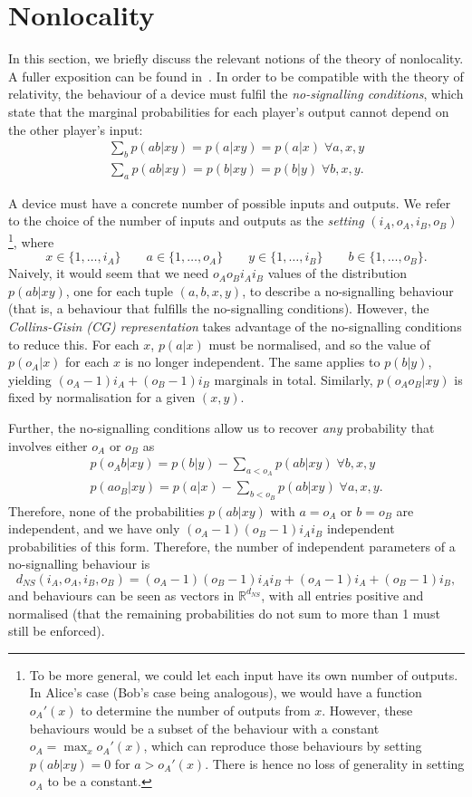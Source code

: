 \documentclass[10pt, a4paper]{article}
\numberwithin{equation}{section} %
\theoremstyle{definition}
\theoremstyle{plain}
\newcommand{\dintv}[2]{\mathopen\{#1,\ldots,#2\mathclose\}}
\newcommand{\?}{\mathrel{?}} %
\newcommand{\R}{\mathbb{R}} %
\begin{document}
  \section{Nonlocality}\label{sec:nl}

  In this section, we briefly discuss the relevant notions of the theory of nonlocality. A fuller exposition can be found in~\cite{BellNonlocality}. In order to be compatible with the theory of relativity, the behaviour of a device must fulfil the \emph{no-signalling conditions}, which state that the marginal probabilities for each player's output cannot depend on the other player's input:
  \begin{gather}
    \sum_b p(ab|xy) = p(a|xy) = p(a|x)\;\forall a,x,y \\
    \sum_a p(ab|xy) = p(b|xy) = p(b|y)\;\forall b,x,y.
  \end{gather}

  A device must have a concrete number of possible inputs and outputs. We refer to the choice of the number of inputs and outputs as the \emph{setting} \((i_A, o_A, i_B, o_B)\)\footnote{To be more general, we could let each input have its own number of outputs. In Alice's case (Bob's case being analogous), we would have a function \(o_A'(x)\) to determine the number of outputs from \(x\). However, these behaviours would be a subset of the behaviour with a constant \(o_A = \max_x o_A'(x)\), which can reproduce those behaviours by setting \(p(ab|xy) = 0\) for \(a > o_A'(x)\). There is hence no loss of generality in setting \(o_A\) to be a constant.}, where
  \[ x \in \dintv{1}{i_A} \qquad a \in \dintv{1}{o_A} \qquad y \in \dintv{1}{i_B} \qquad b \in \dintv{1}{o_B}. \]
  Naively, it would seem that we need \(o_A o_B i_A i_B\) values of the distribution \(p(ab|xy)\), one for each tuple \((a, b, x, y)\), to describe a no-signalling behaviour (that is, a behaviour that fulfills the no-signalling conditions). However, the \emph{Collins-Gisin (CG) representation} takes advantage of the no-signalling conditions to reduce this. For each \(x\), \(p(a|x)\) must be normalised, and so the value of \(p(o_A|x)\) for each \(x\) is no longer independent. The same applies to \(p(b|y)\), yielding \((o_A-1)i_A + (o_B-1)i_B\) marginals in total. Similarly, \(p(o_A o_B|xy)\) is fixed by normalisation for a given \((x,y)\).

  Further, the no-signalling conditions allow us to recover \emph{any} probability that involves either \(o_A\) or \(o_B\) as
  \begin{gather*}
    p(o_A b|xy) = p(b|y) - \sum_{a < o_A} p(ab|xy)\;\forall b,x,y \\
    p(ao_B|xy) = p(a|x) - \sum_{b < o_B} p(ab|xy)\;\forall a,x,y.
  \end{gather*}
  Therefore, none of the probabilities \(p(ab|xy)\) with \(a = o_A\) or \(b = o_B\) are independent, and we have only \((o_A-1)(o_B-1){i_A}{i_B}\) independent probabilities of this form. Therefore, the number of independent parameters of a no-signalling behaviour is
  \[ d_{NS}(i_A, o_A, i_B, o_B) = (o_A-1)(o_B-1){i_A}{i_B} + (o_A-1)i_A + (o_B-1)i_B, \]
  and behaviours can be seen as vectors in \(\R^{d_{NS}}\), with all entries positive and normalised (that the remaining probabilities do not sum to more than 1 must still be enforced).
\end{document}
